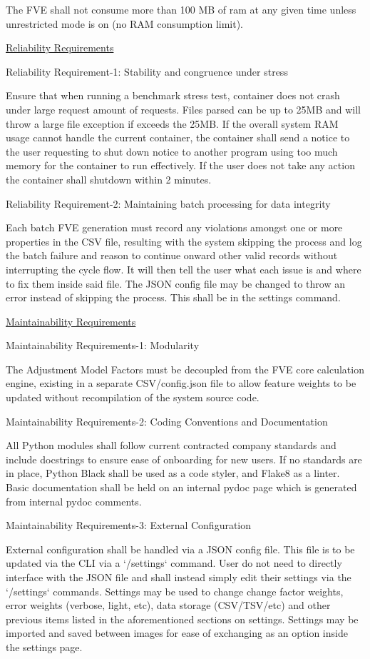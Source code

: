 \documentclass[
]{article}
\begin{document}
The FVE shall not consume more than 100 MB of ram at any given time
unless unrestricted mode is on (no RAM consumption limit).

\ul{Reliability Requirements}

Reliability Requirement-1: Stability and congruence under stress

Ensure that when running a benchmark stress test, container does not
crash under large request amount of requests. Files parsed can be up to
25MB and will throw a large file exception if exceeds the 25MB. If the
overall system RAM usage cannot handle the current container, the
container shall send a notice to the user requesting to shut down notice
to another program using too much memory for the container to run
effectively. If the user does not take any action the container shall
shutdown within 2 minutes.

Reliability Requirement-2: Maintaining batch processing for data
integrity

Each batch FVE generation must record any violations amongst one or more
properties in the CSV file, resulting with the system skipping the
process and log the batch failure and reason to continue onward other
valid records without interrupting the cycle flow. It will then tell the
user what each issue is and where to fix them inside said file. The JSON
config file may be changed to throw an error instead of skipping the
process. This shall be in the settings command.

\ul{Maintainability Requirements}

Maintainability Requirements-1: Modularity

The Adjustment Model Factors must be decoupled from the FVE core
calculation engine, existing in a separate CSV/config.json file to allow
feature weights to be updated without recompilation of the system source
code.

Maintainability Requirements-2: Coding Conventions and Documentation

All Python modules shall follow current contracted company standards and
include docstrings to ensure ease of onboarding for new users. If no
standards are in place, Python Black shall be used as a code styler, and
Flake8 as a linter. Basic documentation shall be held on an internal
pydoc page which is generated from internal pydoc comments.

Maintainability Requirements-3: External Configuration

External configuration shall be handled via a JSON config file. This
file is to be updated via the CLI via a `/settings` command. User do not
need to directly interface with the JSON file and shall instead simply
edit their settings via the `/settings` commands. Settings may be used
to change change factor weights, error weights (verbose, light, etc),
data storage (CSV/TSV/etc) and other previous items listed in the
aforementioned sections on settings. Settings may be imported and saved
between images for ease of exchanging as an option inside the settings
page.
\end{document}
